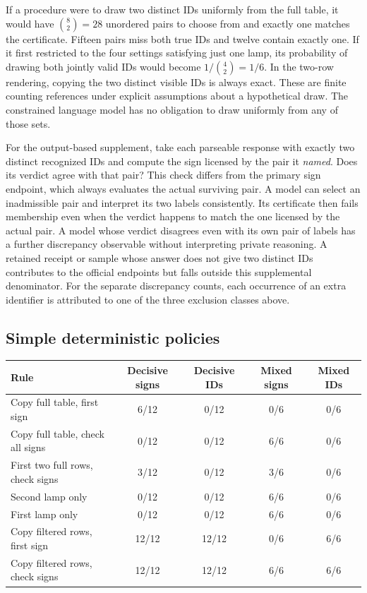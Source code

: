 \documentclass[12pt,letterpaper]{article}
\begin{document}
If a procedure were to draw two distinct IDs uniformly from the full table, it would have $\binom82=28$ unordered pairs to choose from and exactly one matches the certificate. Fifteen pairs miss both true IDs and twelve contain exactly one. If it first restricted to the four settings satisfying just one lamp, its probability of drawing both jointly valid IDs would become $1/\binom42=1/6$. In the two-row rendering, copying the two distinct visible IDs is always exact. These are finite counting references under explicit assumptions about a hypothetical draw. The constrained language model has no obligation to draw uniformly from any of those sets.

For the output-based supplement, take each parseable response with exactly two distinct recognized IDs and compute the sign licensed by the pair it \emph{named}. Does its verdict agree with that pair? This check differs from the primary sign endpoint, which always evaluates the actual surviving pair. A model can select an inadmissible pair and interpret its two labels consistently. Its certificate then fails membership even when the verdict happens to match the one licensed by the actual pair. A model whose verdict disagrees even with its own pair of labels has a further discrepancy observable without interpreting private reasoning. A retained receipt or sample whose answer does not give two distinct IDs contributes to the official endpoints but falls outside this supplemental denominator. For the separate discrepancy counts, each occurrence of an extra identifier is attributed to one of the three exclusion classes above.

\subsection{Simple deterministic policies}

\begin{center}{\footnotesize\setlength{\tabcolsep}{4pt}\begin{tabularx}{\linewidth}{@{}Ycccc@{}}\toprule
Rule & Decisive signs & Decisive IDs & Mixed signs & Mixed IDs\\ \midrule
Copy full table, first sign & 6/12 & 0/12 & 0/6 & 0/6\\
Copy full table, check all signs & 0/12 & 0/12 & 6/6 & 0/6\\
First two full rows, check signs & 3/12 & 0/12 & 3/6 & 0/6\\
Second lamp only & 0/12 & 0/12 & 6/6 & 0/6\\
First lamp only & 0/12 & 0/12 & 6/6 & 0/6\\
Copy filtered rows, first sign & 12/12 & 12/12 & 0/6 & 6/6\\
Copy filtered rows, check signs & 12/12 & 12/12 & 6/6 & 6/6\\ \bottomrule\end{tabularx}}
\end{center}
\end{document}
